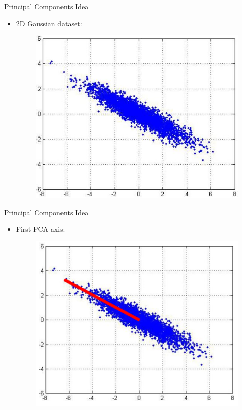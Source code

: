 \documentclass[serif, aspectratio=169]{beamer}
\begin{document}
\begin{frame}{Principal Components Idea}
    \begin{itemize}
        \item 2D Gaussian dataset:
         \begin{figure}[htpb]
            \begin{center}
                \includegraphics[keepaspectratio, scale=0.6]{pic/pcaData.JPG}
            \end{center}
        \end{figure}
    \end{itemize}
\end{frame}

\begin{frame}{Principal Components Idea}
    \begin{itemize}
        \item First PCA axis:
         \begin{figure}[htpb]
            \begin{center}
                \includegraphics[keepaspectratio, scale=1]{pic/pcaData1.JPG}
            \end{center}
        \end{figure}
    \end{itemize}
\end{frame}
\end{document}
